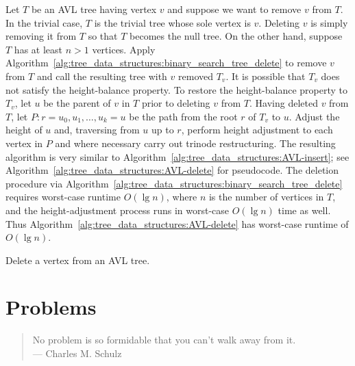 Let $T$ be an AVL tree having vertex $v$ and suppose we want to remove
$v$ from $T$. In the trivial case, $T$ is the trivial tree whose sole
vertex is $v$. Deleting $v$ is simply removing it from $T$ so that $T$
becomes the null tree. On the other hand, suppose $T$ has at least
$n > 1$ vertices. Apply
Algorithm~\ref{alg:tree_data_structures:binary_search_tree_delete} to
remove $v$ from $T$ and call the resulting tree with $v$ removed
$T_v$. It is possible that $T_v$ does not satisfy the height-balance
property. To restore the height-balance property to $T_v$, let $u$ be
the parent of $v$ in $T$ prior to deleting $v$ from $T$. Having
deleted $v$ from $T$, let $P: r = u_0, u_1, \dots, u_k = u$ be the
path from the root $r$ of $T_v$ to $u$. Adjust the height of $u$ and,
traversing from $u$ up to $r$, perform height adjustment to each
vertex in $P$ and where necessary carry out trinode restructuring. The
resulting algorithm is very similar to
Algorithm~\ref{alg:tree_data_structures:AVL-insert}; see
Algorithm~\ref{alg:tree_data_structures:AVL-delete} for
pseudocode. The deletion procedure via
Algorithm~\ref{alg:tree_data_structures:binary_search_tree_delete}
requires worst-case runtime $O(\lg n)$, where $n$ is the number of
vertices in $T$, and the height-adjustment process runs in worst-case
$O(\lg n)$ time as well. Thus
Algorithm~\ref{alg:tree_data_structures:AVL-delete} has worst-case
runtime of $O(\lg n)$.

\begin{algorithm}[!htbp]

\caption{Delete a vertex from an AVL tree.}
\label{alg:tree_data_structures:AVL-delete}
\end{algorithm}



\section{Problems}

\begin{quote}
\footnotesize
No problem is so formidable that you can't walk away from it. \\
\noindent
--- Charles M. Schulz
\end{quote}

